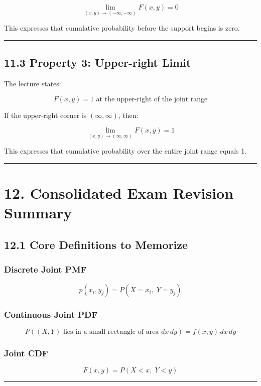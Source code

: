 \documentclass[12pt]{article}
\begin{document}
\[
\lim_{(x,y)\to(-\infty,-\infty)} F(x,y)=0
\]

This expresses that cumulative probability before the support begins is zero.

\hrule
\vspace{1em}

\subsection*{11.3 Property 3: Upper-right Limit}

The lecture states:

\[
F(x,y)=1 \text{ at the upper-right of the joint range}
\]

If the upper-right corner is \((\infty,\infty)\), then:

\[
\lim_{(x,y)\to(\infty,\infty)} F(x,y)=1
\]

This expresses that cumulative probability over the entire joint range equals 1.

\hrule
\vspace{1em}

\section*{12. Consolidated Exam Revision Summary}

\subsection*{12.1 Core Definitions to Memorize}

\subsubsection*{Discrete Joint PMF}

\[
p(x_i,y_j)=P(X=x_i,\;Y=y_j)
\]

\subsubsection*{Continuous Joint PDF}

\[
P((X,Y)\text{ lies in a small rectangle of area }dx\,dy)=f(x,y)\,dx\,dy
\]

\subsubsection*{Joint CDF}

\[
F(x,y)=P(X<x,\;Y<y)
\]

\hrule
\vspace{1em}
\end{document}
